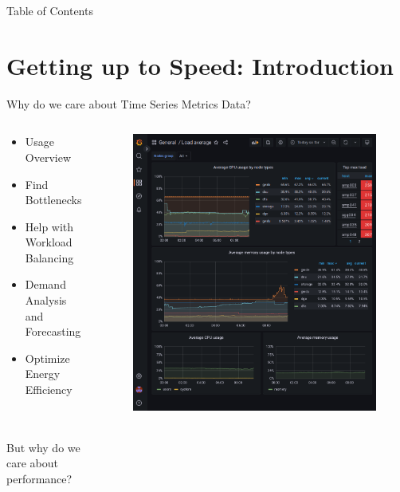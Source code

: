 \documentclass[compress,aspectratio=169]{beamer}
\begin{document}
\begin{frame}[plain]
	\titlepage
\end{frame}

\begin{frame}[t]{Table of Contents}
  \tableofcontents[subsectionstyle=hide/hide]
\end{frame}


\section[Introduction]{Getting up to Speed: Introduction}
\begin{frame}{Why do we care about Time Series Metrics Data?}
\begin{columns}[T]
\begin{column}{0.5\textwidth}
\begin{itemize}
  \item Usage Overview
  \item Find Bottlenecks
  \item Help with Workload Balancing
  \item Demand Analysis and Forecasting
  \item Optimize Energy Efficiency
\end{itemize}
~\\~\\
But why do we care about performance?
\end{column}
\begin{column}{0.5\textwidth}
\begin{figure}
  \includegraphics[height=.8\textheight]{example_grafana_dashboard.png}
\end{figure}
\end{column}
\end{columns}
\end{frame}
\end{document}
